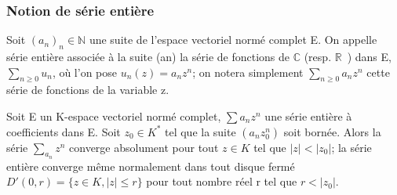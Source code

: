
\subsubsection{Notion de série entière}
\label{sec:notion-de-serie}


%
%
%
%
%
\begin{de}
Soit $(a_n)_n \in \mathbb{N}$ une suite de l'espace
 vectoriel normé complet E. On appelle série entière associée à la suite
 (an) la série de fonctions de $\mathbb{C}$ (resp. $\mathbb{R}$~) dans E,
 $\sum_{n \geq 0} u_n$, où l'on pose $u_n(z) = a_n z^n$; on notera simplement
 $\sum_{n \geq 0} a_n z^n $ cette série de fonctions de la
 variable z.
 \end{de}
%
%
%
\begin{lem}[Abel]
Soit E un K-espace vectoriel normé complet,
$\sum a_n z^n$ une série entière à coefficients dans E. Soit
$z_0 \in K^*$ tel que la suite
$(a_n z_0^n)$ soit bornée. Alors la série
$\sum_{a_n} z^n$ converge absolument pour tout $z \in K$ tel que
$|z| < |z_0|$; la
série entière converge même normalement dans tout disque fermé $D'(0,r) =
\{ z \in K,|z|\leq r\} $
pour tout nombre réel r tel que $r <
|z_0|$.
\end{lem}
